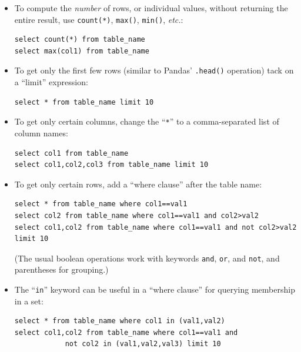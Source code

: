 \begin{itemize}
\itemsep.1em
\item To compute the \textit{number} of rows, or individual values, without
returning the entire result, use \texttt{count(*)}, \texttt{max()},
\texttt{min()}, \textit{etc.}:

\footnotesize
\begin{Verbatim}[fontsize=\footnotesize,samepage=true,frame=lines]
select count(*) from table_name
select max(col1) from table_name
\end{Verbatim}
\normalsize

\item To get only the first few rows (similar to Pandas' \texttt{.head()}
operation) tack on a ``limit'' expression:

\footnotesize
\begin{Verbatim}[fontsize=\footnotesize,samepage=true,frame=lines]
select * from table_name limit 10
\end{Verbatim}
\normalsize

\item To get only certain columns, change the ``\texttt{*}'' to a
comma-separated list of column names:

\footnotesize
\begin{Verbatim}[fontsize=\footnotesize,samepage=true,frame=lines]
select col1 from table_name
select col1,col2,col3 from table_name limit 10
\end{Verbatim}
\normalsize

\item To get only certain rows, add a ``where clause'' after the table name:

\footnotesize
\begin{Verbatim}[fontsize=\footnotesize,samepage=true,frame=lines]
select * from table_name where col1==val1
select col2 from table_name where col1==val1 and col2>val2
select col1,col2 from table_name where col1==val1 and not col2>val2 limit 10
\end{Verbatim}
\normalsize

(The usual boolean operations work with keywords \texttt{and}, \texttt{or},
and \texttt{not}, and parentheses for grouping.)

\item The ``\texttt{in}'' keyword can be useful in a ``where clause'' for
querying membership in a set:

\scriptsize
\begin{Verbatim}[fontsize=\footnotesize,samepage=true,frame=lines]
select * from table_name where col1 in (val1,val2)
select col1,col2 from table_name where col1==val1 and
            not col2 in (val1,val2,val3) limit 10
\end{Verbatim}
\normalsize


\end{itemize}
